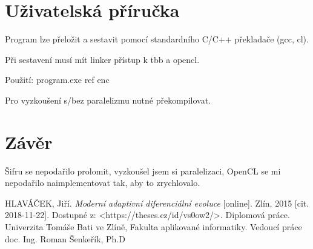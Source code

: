 \documentclass[11pt,a4paper]{scrartcl}
\begin{document}
	\section{Uživatelská příručka}
	Program lze přeložit a sestavit pomocí standardního C/C++ překladače (gcc, cl).
	
	Při sestavení musí mít linker přístup k tbb a opencl. 
	
	Použití: program.exe ref enc 
	
	Pro vyzkoušení s/bez paralelizmu nutné překompilovat.
	

	
	\section{Závěr}
	Šifru se nepodařilo prolomit, vyzkoušel jsem si paralelizaci, OpenCL se mi nepodařilo naimplementovat tak, aby to zrychlovalo.
	
	\begin{thebibliography}{9}
		HLAVÁČEK, Jiří. \textit{Moderní adaptivní diferenciální evoluce} [online]. Zlín, 2015 [cit. 2018-11-22]. Dostupné z: \textless https://theses.cz/id/vs0ow2/\textgreater. Diplomová práce. Univerzita Tomáše Bati ve Zlíně, Fakulta aplikované informatiky. Vedoucí práce doc. Ing. Roman Šenkeřík, Ph.D
	\end{thebibliography}
	
\end{document}
